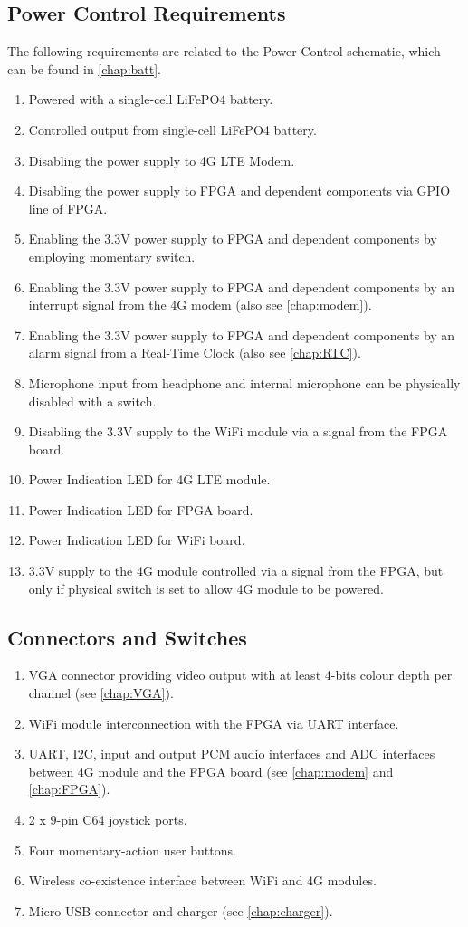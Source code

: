\subsection{Power Control Requirements}
The following requirements are related to the Power Control schematic, which can be found in \autoref{chap:batt}.
\begin{enumerate}
\item Powered with a single-cell LiFePO4 battery.
\item Controlled output from single-cell LiFePO4 battery. 
\item Disabling the power supply to 4G LTE Modem.
\item Disabling the power supply to FPGA and dependent components via GPIO line of FPGA.
\item Enabling the 3.3V power supply to FPGA and dependent components by employing momentary switch.
\item Enabling the 3.3V power supply to FPGA and dependent components by an interrupt signal from the 4G modem (also see \autoref{chap:modem}).
\item Enabling the 3.3V power supply to FPGA and dependent components by an alarm signal from a Real-Time Clock (also see \autoref{chap:RTC}).
\item Microphone input from headphone and internal microphone can be physically disabled with a switch.
\item Disabling the 3.3V supply to the WiFi module via a signal from the FPGA board.
\item Power Indication LED for 4G LTE module.
\item Power Indication LED for FPGA board.
\item Power Indication LED for WiFi board.
\item 3.3V supply to the 4G module controlled via a signal from the FPGA, but only if physical switch is set to allow 4G module to be powered.
\end{enumerate}

\subsection{Connectors and Switches}
\begin{enumerate}
\item VGA connector providing video output with at least 4-bits colour depth per channel (see \autoref{chap:VGA}).
\item WiFi module interconnection with the FPGA via UART interface.
\item UART, I2C, input and output PCM audio interfaces and ADC interfaces between 4G module and the FPGA board (see \autoref{chap:modem} and \autoref{chap:FPGA}).
\item 2 x 9-pin C64 joystick ports.
\item Four momentary-action user buttons.
\item Wireless co-existence interface between WiFi and 4G modules.
\item Micro-USB connector and charger (see \autoref{chap:charger}).
\end{enumerate}

